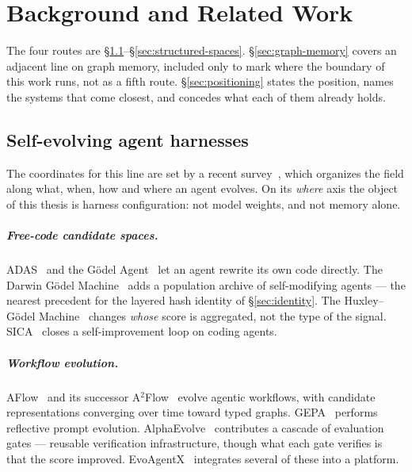 \chapter{Background and Related Work}
\label{ch:related}


The four routes are \S\ref{sec:self-evolving}--\S\ref{sec:structured-spaces}.
\S\ref{sec:graph-memory} covers an adjacent line on graph memory, included
only to mark where the boundary of this work runs, not as a fifth route.
\S\ref{sec:positioning} states the position, names the systems that come
closest, and concedes what each of them already holds.

\section{Self-evolving agent harnesses}
\label{sec:self-evolving}

The coordinates for this line are set by a recent survey~\cite{survey-selfevolve},
which organizes the field along what, when, how and where an agent evolves.
On its \emph{where} axis the object of this thesis is harness
configuration: not model weights, and not memory alone.

\paragraph{Free-code candidate spaces.} ADAS~\cite{adas} and the G\"odel
Agent~\cite{godel-agent} let an agent rewrite its own code directly. The
Darwin G\"odel Machine~\cite{dgm} adds a population archive of
self-modifying agents --- the nearest precedent for the layered hash
identity of \S\ref{sec:identity}. The Huxley--G\"odel
Machine~\cite{hgm} changes \emph{whose} score is aggregated, not the type
of the signal. SICA~\cite{sica} closes a self-improvement loop on coding
agents.

\paragraph{Workflow evolution.} AFlow~\cite{aflow} and its successor
A$^2$Flow~\cite{a2flow} evolve agentic workflows, with candidate
representations converging over time toward typed graphs.
GEPA~\cite{gepa} performs reflective prompt evolution.
AlphaEvolve~\cite{alphaevolve} contributes a cascade of evaluation gates
--- reusable verification infrastructure, though what each gate verifies is
that the score improved. EvoAgentX~\cite{evoagentx} integrates several of
these into a platform.

